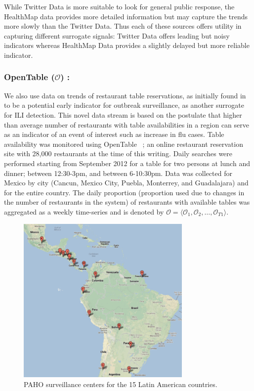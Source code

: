 While Twitter Data is more suitable to look for general public response, the
HealthMap data provides more detailed information but may capture the trends
more slowly than the Twitter Data. Thus each of these sources offers utility in
capturing different surrogate signals: Twitter Data offers leading but noisy
indicators whereas HealthMap Data provides a slightly delayed but more reliable
indicator.

\subsubsection{OpenTable ($\mathcal{O}$) :}
We also use data on trends of restaurant table reservations, as initially 
found in~\cite{elaine2013opentable} to be a potential early indicator for
outbreak surveillance, as another surrogate for ILI detection.
This novel data stream is based on the
postulate that higher than average number of restaurants with table
availabilities in a region can serve as an indicator of an event of interest
such as increase in flu cases. Table availability was monitored using OpenTable
~\cite{Opentable:2013}; an online restaurant reservation site with 28,000 restaurants at the time
of this writing. Daily searches were performed starting from September 2012 for
a table for two persons at lunch and dinner; between 12:30-3pm, and between
6-10:30pm. Data was collected for Mexico by city (Cancun, Mexico City, Puebla,
Monterrey, and Guadalajara) and for the entire country. The daily proportion
(proportion used due to changes in the number of restaurants in the system) of
restaurants with available tables was aggregated as a weekly time-series and
is denoted by 
$\mathcal{O} = \langle \mathcal{O}_1, \mathcal{O}_2, \dots, \mathcal{O}_{T1} \rangle$.


\begin{figure} 
  \includegraphics[width=3.33in]{fig/humidity_centers.pdf}
  \caption{\label{fig:surveillance} PAHO surveillance centers for the 15 Latin
  American countries.}
\end{figure}

